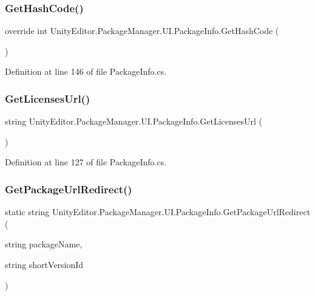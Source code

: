 \subsubsection{\texorpdfstring{GetHashCode()}{GetHashCode()}}
{\footnotesize\ttfamily override int Unity\+Editor.\+Package\+Manager.\+U\+I.\+Package\+Info.\+Get\+Hash\+Code (\begin{DoxyParamCaption}{ }\end{DoxyParamCaption})}



Definition at line 146 of file Package\+Info.\+cs.

\mbox{\label{class_unity_editor_1_1_package_manager_1_1_u_i_1_1_package_info_a112f0fd0999127b5599d3e1ff6dfa1f2}} 
\subsubsection{\texorpdfstring{GetLicensesUrl()}{GetLicensesUrl()}}
{\footnotesize\ttfamily string Unity\+Editor.\+Package\+Manager.\+U\+I.\+Package\+Info.\+Get\+Licenses\+Url (\begin{DoxyParamCaption}{ }\end{DoxyParamCaption})}



Definition at line 127 of file Package\+Info.\+cs.

\mbox{\label{class_unity_editor_1_1_package_manager_1_1_u_i_1_1_package_info_a2c33bdbbdd79e3f30864d5841ad4d44c}} 
\subsubsection{\texorpdfstring{GetPackageUrlRedirect()}{GetPackageUrlRedirect()}}
{\footnotesize\ttfamily static string Unity\+Editor.\+Package\+Manager.\+U\+I.\+Package\+Info.\+Get\+Package\+Url\+Redirect (\begin{DoxyParamCaption}\item[{string}]{package\+Name,  }\item[{string}]{short\+Version\+Id }\end{DoxyParamCaption})\hspace{0.3cm}{\ttfamily [static]}}



